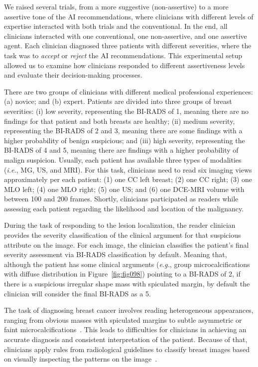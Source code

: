 We raised several trials, from a more suggestive (non-assertive) to a more assertive tone of the \ac{AI} recommendations, where clinicians with different levels of expertise interacted with both trials and the conventional.
In the end, all clinicians interacted with one conventional, one non-assertive, and one assertive agent.
Each clinician diagnosed three patients with different severities, where the task was to {\it accept} or {\it reject} the \ac{AI} recommendations.
This experimental setup allowed us to examine how clinicians responded to different assertiveness levels and evaluate their decision-making processes.

There are two groups of clinicians with different medical professional experiences:
(a) novice; and
(b) expert.
Patients are divided into three groups of breast severities:
(i) low severity, representing the \ac{BI-RADS} of 1, meaning there are no findings for that patient and both breasts are healthy;
(ii) medium severity, representing the \ac{BI-RADS} of 2 and 3, meaning there are some findings with a higher probability of benign suspicious; and
(iii) high severity, representing the \ac{BI-RADS} of 4 and 5, meaning there are findings with a higher probability of malign suspicion.
Usually, each patient has available three types of modalities ({\it i.e.}, \ac{MG}, \ac{US}, and \ac{MRI}).
For this task, clinicians need to read six imaging views approximately per each patient:
(1) one \acs{CC} left breast;
(2) one \acs{CC} right;
(3) one \acs{MLO} left;
(4) one \acs{MLO} right;
(5) one \acs{US}; and
(6) one \acs{DCE-MRI} volume with between 100 and 200 frames.
Shortly, clinicians participated as readers while assessing each patient regarding the likelihood and location of the malignancy.

During the task of responding to the lesion localization, the reader clinician provides the severity classification of the clinical argument for that suspicious attribute on the image.
For each image, the clinician classifies the patient's final severity assessment via \ac{BI-RADS} classification by default.
Meaning that, although the patient has some clinical arguments ({\it e.g.}, group microcalcifications with diffuse distribution in Figure~\ref{fig:fig098}) pointing to a \ac{BI-RADS} of 2, if there is a suspicious irregular shape mass with spiculated margin, by default the clinician will consider the final \ac{BI-RADS} as a 5.

The task of diagnosing breast cancer involves reading heterogeneous appearances, ranging from obvious masses with spiculated margins to subtle asymmetric or faint microcalcifications~\cite{Sturesdotter2020}.
This leads to difficulties for clinicians in achieving an accurate diagnosis and consistent interpretation of the patient.
Because of that, clinicians apply rules from radiological guidelines to classify breast images based on visually inspecting the patterns on the image~\cite{doi:10.1148/radiol.2020192534}.

